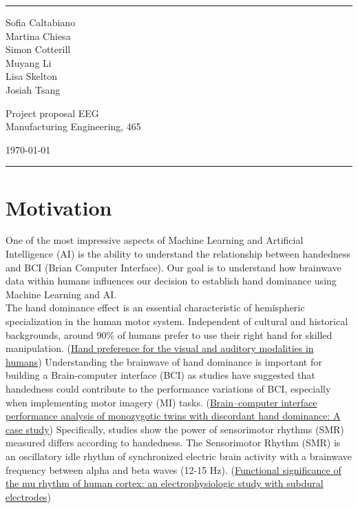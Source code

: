 \documentclass[a4paper]{article}
\begin{document}

\fancyhead[C]{}
\hrule \medskip %
\begin{minipage}{0.295\textwidth} 
\raggedright
\footnotesize
Sofia Caltabiano \hfill\\  
Martina Chiesa \hfill\\ 
Simon Cotterill \hfill\\
Muyang Li \hfill\\
Lisa Skelton \hfill\\
Josiah Tsang \hfill\\
\end{minipage}
\begin{minipage}{0.4\textwidth} 
\centering 
\large 
Project proposal EEG\\ 
\normalsize 
Manufacturing Engineering, 465\\ 
\end{minipage}
\begin{minipage}{0.295\textwidth} 
\raggedleft
\today\hfill\\
\end{minipage}
\medskip\hrule 
\bigskip


\section{Motivation}

One of the most impressive aspects of Machine Learning and Artificial Intelligence (AI) is the ability to understand the relationship between handedness and BCI (Brian Computer Interface). Our goal is to understand how brainwave data within humans influences our decision to establish hand dominance using Machine Learning and AI.\\

The hand dominance effect is an essential characteristic of hemispheric specialization in the human motor system. Independent of cultural and historical backgrounds, around 90\% of humans prefer to use their right hand for skilled manipulation. ({\href{https://www.nature.com/articles/s41598-021-87396-4}{Hand preference for the visual and auditory modalities in humans}}) Understanding the brainwave of hand dominance is important for building a Brain-computer interface (BCI) as studies have suggested that handedness could contribute to the performance variations of BCI, especially when implementing motor imagery (MI) tasks.  ({\href{https://pubmed.ncbi.nlm.nih.gov/31918621/}{Brain–computer interface performance analysis of monozygotic twins with discordant hand dominance: A case study}}) Specifically, studies show the power of sensorimotor rhythms (SMR) measured differs according to handedness. The Sensorimotor Rhythm (SMR) is an oscillatory idle rhythm of synchronized electric brain activity with a brainwave frequency between alpha and beta waves (12-15 Hz).  ({\href{https://pubmed.ncbi.nlm.nih.gov/7691544/}{Functional significance of the mu rhythm of human cortex: an electrophysiologic study with subdural electrodes}})\\
\end{document}
